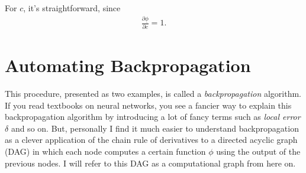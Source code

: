 \documentclass{report}
\begin{document}
For $c$, it's straightforward, since 
\begin{align*}
    \frac{\partial \underline{\phi}}{\partial c} = 1.
\end{align*}


\section{Automating Backpropagation}
\label{sec:autodiff}

This procedure, presented as two examples, is called a {\em backpropagation}
algorithm. If you read textbooks on neural networks, you see a fancier way to
explain this backpropagation algorithm by introducing a lot of fancy terms such
as {\em local error} $\delta$ and so on. But, personally I find it much easier
to understand backpropagation as a clever application of the chain rule of
derivatives to a directed acyclic graph (DAG) in which each node computes a certain
function $\phi$ using the output of the previous nodes. I will refer to this
DAG as a computational graph from here on.
\end{document}
